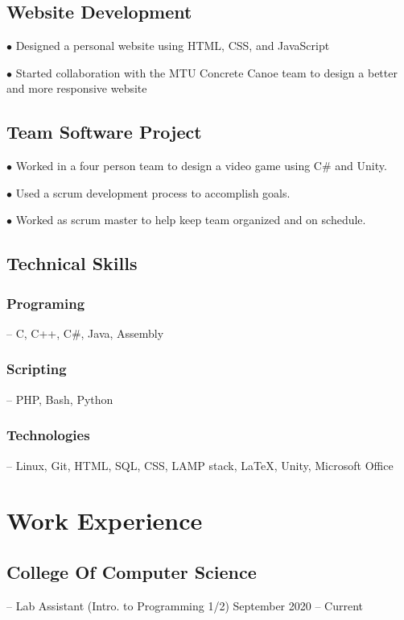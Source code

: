 \documentclass{article}
\begin{document}
\subsection{Website Development}\hfill

$\bullet$ Designed a personal website using HTML, CSS, and JavaScript

$\bullet$ Started collaboration with the MTU Concrete Canoe team to design a better and more responsive website


\subsection{Team Software Project} \hfill

$\bullet$ Worked in a four person team to design a video game using C\# and Unity.

$\bullet$ Used a scrum development process to accomplish goals.

$\bullet$ Worked as scrum master to help keep team organized and on schedule.

\subsection{Technical Skills} \hfill

\subsubsection{Programing}-- C, C++, C\#, Java, Assembly
\subsubsection{Scripting}-- PHP, Bash, Python
\subsubsection{Technologies}-- Linux, Git, HTML, SQL, CSS, LAMP stack, {\LaTeX}, Unity, Microsoft Office

\section{Work Experience}

\subsection{College Of Computer Science} -- Lab Assistant (Intro. to Programming 1/2) \hfill September 2020 -- Current
\end{document}
